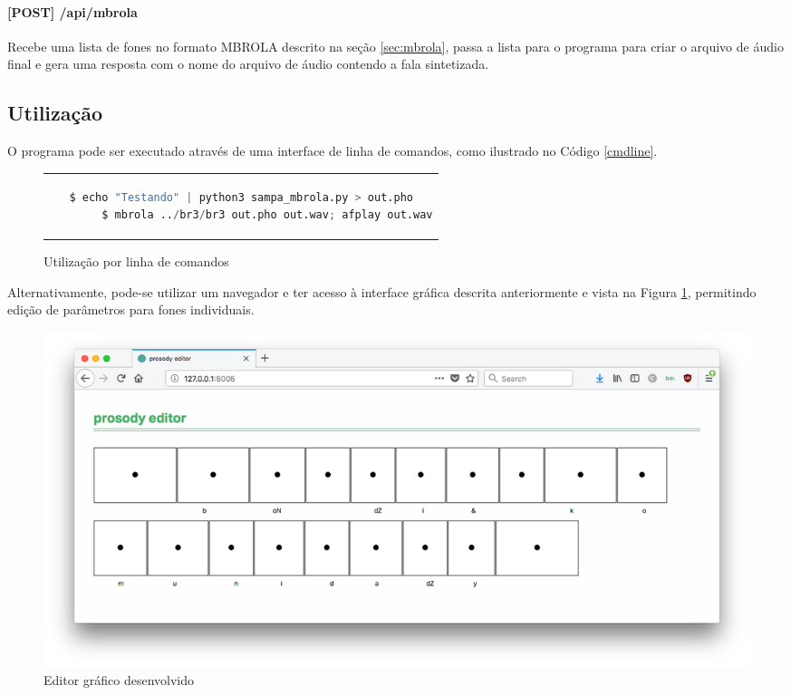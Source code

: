 \paragraph{[POST] /api/mbrola} Recebe uma lista de fones no formato MBROLA
descrito na seção \ref{sec:mbrola}, passa a lista para o programa para criar o
arquivo de áudio final e gera uma resposta com o nome do arquivo de áudio
contendo a fala sintetizada.
\subsection{Utilização}
O programa pode ser executado através de uma interface de linha de comandos,
como ilustrado no Código \ref{cmdline}.

\begin{figure}[thp]
    \centering
    \begin{tabular}{c}
        \begin{lstlisting}[label=cmdline, language=Python]
        $ echo "Testando" | python3 sampa_mbrola.py > out.pho
        $ mbrola ../br3/br3 out.pho out.wav; afplay out.wav
        \end{lstlisting}

    \end{tabular}
    \caption{Utilização por linha de comandos}
\end{figure}
Alternativamente, pode-se utilizar um navegador e ter acesso à interface
gráfica descrita anteriormente e vista na Figura \ref{fig:ed}, permitindo
edição de parâmetros para fones individuais.

\begin{figure}[!htbp]
  \centering
    \includegraphics[width=1.0\textwidth]{Imagens/editor.png}
  \caption{Editor gráfico desenvolvido}
  \label{fig:ed}
\end{figure}



